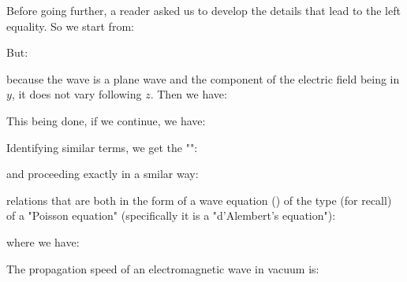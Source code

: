 	Before going further, a reader asked us to develop the details that lead to the left equality. So we start from:
	
	But:
	
	because the wave is a plane wave and the component of the electric field being in $y$, it does not vary following $z$. Then we have:
	
	This being done, if we continue, we have:
	
	Identifying similar terms, we get the "":
	
	and proceeding exactly in a smilar way:
	
	relations that are both in the form of a wave equation () of the type (for recall) of a "Poisson equation" (specifically it is a "d'Alembert's equation"):
	
	where we have:
	
	The propagation speed of an electromagnetic wave in vacuum is:
	
